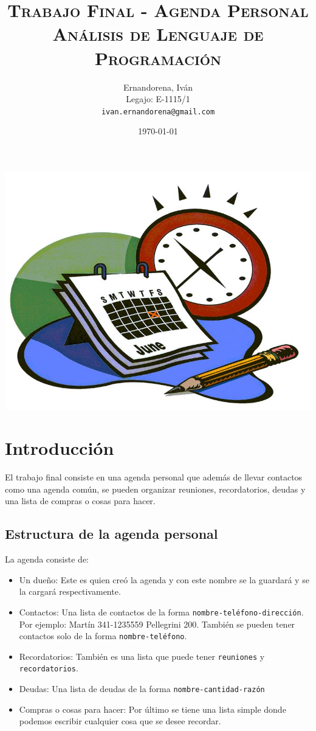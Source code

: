 \documentclass[a4paper,12pt]{article}
\author{
        Ernandorena, Iván\\
        Legajo: E-1115/1\\
        \texttt{ivan.ernandorena@gmail.com}
}
\date{\today}
\title {
    \Huge\textsc{Trabajo Final - Agenda Personal\\}
    \large\textsc{Análisis de Lenguaje de Programación}
}
\begin{document}
  \thispagestyle{empty}
  \maketitle
  \begin{center}
  \includegraphics[scale=0.5]{photo}
  \end{center}

  \newpage
  \section*{Introducción}
    El trabajo final consiste en una agenda personal que además de llevar contactos como una agenda común, se
    pueden organizar reuniones, recordatorios, deudas y una lista de compras o cosas para hacer.
    \subsection*{Estructura de la agenda personal}
    La agenda consiste de:
    \begin{itemize}
      \item Un dueño: Este es quien creó la agenda y con este nombre se la guardará y se la cargará respectivamente.
      \item Contactos: Una lista de contactos de la forma \texttt{nombre-teléfono-dirección}.\\
      Por ejemplo: Martín 341-1235559 Pellegrini 200. También se pueden tener contactos solo de la forma \texttt{nombre-teléfono}.
      \item Recordatorios: También es una lista que puede tener \texttt{reuniones} y \texttt{recordatorios}.
      \item Deudas: Una lista de deudas de la forma \texttt{nombre-cantidad-razón}
      \item Compras o cosas para hacer: Por último se tiene una lista simple donde podemos escribir cualquier cosa que se desee recordar.
    \end{itemize}
\end{document}
